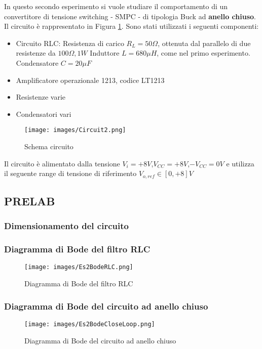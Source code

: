 In questo secondo esperimento si vuole studiare il comportamento di un convertitore di tensione switching - SMPC - di tipologia Buck ad \textbf{anello chiuso}. Il circuito è rappresentato in Figura \ref{fig:Circuit2}. Sono stati utilizzati i seguenti componenti:
\begin{itemize}
    \item Circuito RLC:
    \subitem Resistenza di carico $R_L=50\Omega$, ottenuta dal parallelo di due resistenze da $100\Omega,1W$
    \subitem Induttore $L=680\mu H$, come nel primo esperimento.
    \subitem Condensatore $C=20\mu F$
    \item Amplificatore operazionale 1213, codice LT1213
    \item Resistenze varie 
    \item Condensatori vari
\end{itemize}
\begin{figure}[H]
    \centering
    \texttt{[image: images/Circuit2.png]}
    \caption{Schema circuito}
    \label{fig:Circuit2}
\end{figure}
Il circuito è alimentato dalla tensione $V_i=+8V$,$V_{CC}=+8V$,$-V_{CC}=0V$ e utilizza il seguente range di tensione di riferimento $V_{o,ref}\in [0,+8]V$
\clearpage


\subsection{PRELAB}
\subsubsection{Dimensionamento del circuito}
\subsubsection{Diagramma di Bode del filtro RLC}
\begin{figure}[H]
    \centering
    \texttt{[image: images/Es2BodeRLC.png]}
    \caption{Diagramma di Bode del filtro RLC}
    \label{fig:Es2BodeRLC}
\end{figure}
\subsubsection{Diagramma di Bode del circuito ad anello chiuso}
\begin{figure}[H]
    \centering
    \texttt{[image: images/Es2BodeCloseLoop.png]}
    \caption{Diagramma di Bode del circuito ad anello chiuso}
    \label{fig:Es2BodeCloseLoop}
\end{figure}
\clearpage





